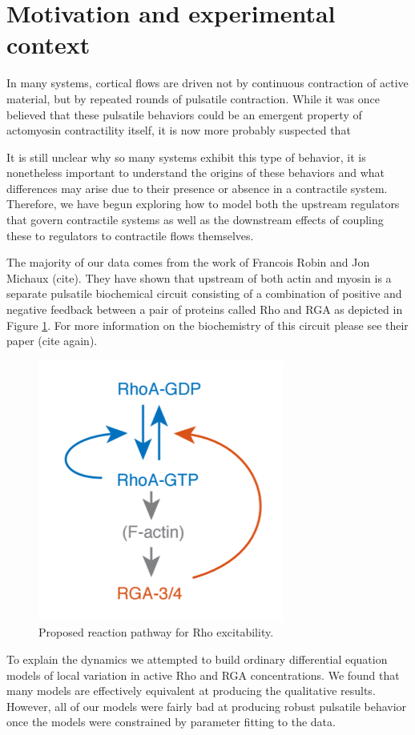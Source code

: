 \section{Motivation and experimental context}
In many systems, cortical flows are driven not by continuous contraction of active material, but by repeated rounds of pulsatile contraction.  While it was once believed that these pulsatile behaviors could be an emergent property of actomyosin contractility itself, it is now more probably suspected that 

It is still unclear why so many systems exhibit this type of behavior, it is nonetheless important to understand the origins of these behaviors and what differences may arise due to their presence or absence in a contractile system.  Therefore, we have begun exploring how to model both the upstream regulators that govern contractile systems as well as the downstream effects of coupling these to regulators to contractile flows themselves.

The majority of our data comes from the work of Francois Robin and Jon Michaux (cite).  They have shown that upstream of both actin and myosin is a separate pulsatile biochemical circuit consisting of a combination of positive and negative feedback between a pair of proteins called Rho and RGA as depicted in Figure \ref{fig:pulse_diag}.  For more information on the biochemistry of this circuit please see their paper (cite again).  

\begin{figure}[h!]
\centering
\includegraphics[width=0.5\hsize]{pulse/diagram.png}
\caption{\label{fig:pulse_diag}  Proposed reaction pathway for Rho excitability.}
\end{figure}

To explain the dynamics we attempted to build ordinary differential equation models of local variation in active Rho and RGA concentrations.  We found that many models are effectively equivalent at producing the qualitative results.  However, all of our models were fairly bad at producing robust pulsatile behavior once the models were constrained by parameter fitting to the data. 


